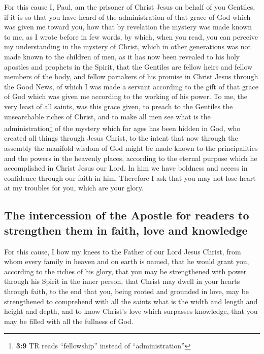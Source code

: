  For this cause I, Paul, am the prisoner of Christ Jesus
on behalf of you Gentiles,  if it is so that you have
heard of the administration of that grace of God which was given me
toward you,  how that by revelation the mystery was made
known to me, as I wrote before in few words,  by which,
when you read, you can perceive my understanding in the mystery of
Christ,  which in other generations was not made known to
the children of men, as it has now been revealed to his holy apostles
and prophets in the Spirit,  that the Gentiles are fellow
heirs and fellow members of the body, and fellow partakers of his
promise in Christ Jesus through the Good News,  of which I
was made a servant according to the gift of that grace of God which was
given me according to the working of his power.  To me,
the very least of all saints, was this grace given, to preach to the
Gentiles the unsearchable riches of Christ,  and to make
all men see what is the administration\footnote{\textbf{3:9} TR reads
  ``fellowship'' instead of ``administration''} of the mystery which for
ages has been hidden in God, who created all things through Jesus
Christ,  to the intent that now through the assembly the
manifold wisdom of God might be made known to the principalities and the
powers in the heavenly places,  according to the eternal
purpose which he accomplished in Christ Jesus our Lord. 
In him we have boldness and access in confidence through our faith in
him.  Therefore I ask that you may not lose heart at my
troubles for you, which are your glory.

\hypertarget{the-intercession-of-the-apostle-for-readers-to-strengthen-them-in-faith-love-and-knowledge}{%
\subsection{The intercession of the Apostle for readers to strengthen
them in faith, love and
knowledge}\label{the-intercession-of-the-apostle-for-readers-to-strengthen-them-in-faith-love-and-knowledge}}

 For this cause, I bow my knees to the Father of our Lord
Jesus Christ,  from whom every family in heaven and on
earth is named,  that he would grant you, according to
the riches of his glory, that you may be strengthened with power through
his Spirit in the inner person,  that Christ may dwell in
your hearts through faith, to the end that you, being rooted and
grounded in love,  may be strengthened to comprehend with
all the saints what is the width and length and height and depth,
 and to know Christ's love which surpasses knowledge,
that you may be filled with all the fullness of God.

